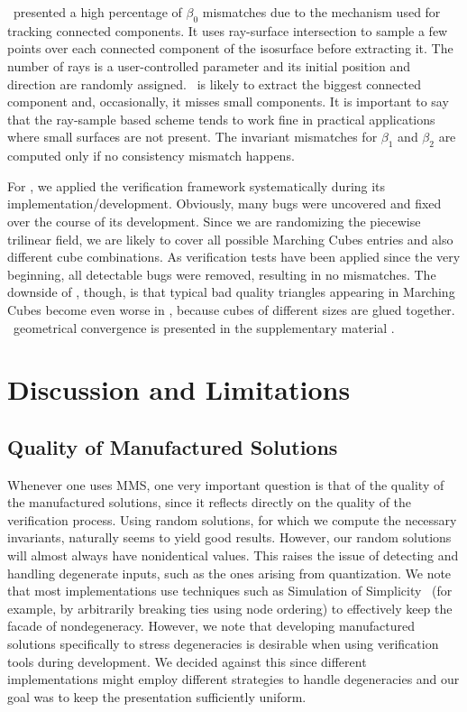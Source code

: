 \deliso\ presented a high percentage of $\beta_0$ mismatches due to the
mechanism used for tracking connected components. It uses ray-surface intersection to
sample a few points over each connected component of the isosurface before extracting it.
The number of rays is a user-controlled parameter and its initial position
and direction are randomly assigned. \deliso\ is likely to extract the biggest
connected component and, occasionally, it misses small components. It is
important to say that
the ray-sample based scheme tends to work fine in practical applications where
small
surfaces are not present. The invariant mismatches for $\beta_1$ and $\beta_2$
are computed only
if no consistency mismatch happens.

For \mcsimpleflow, we applied the verification
framework systematically during its implementation/development. Obviously, many
bugs were uncovered and fixed over the course of its development. 
Since we are randomizing the piecewise trilinear field, we are
likely to cover all possible Marching Cubes entries and also different
cube combinations. As verification tests have been applied since the very beginning,
all detectable bugs were removed, resulting in no mismatches. 
The downside of \mcsimpleflow, though, is that typical bad quality
triangles appearing in Marching Cubes become even worse in
\mcsimpleflow,
because cubes of different sizes are glued together. 
\mcsimpleflow\ geometrical
convergence is presented in the supplementary material
\cite{scheidegger:techreport:2010}.


\section{Discussion and Limitations}
\label{sec:discussion}

\subsection{Quality of Manufactured Solutions}
Whenever one uses MMS, one very important question is that of the quality
of the manufactured solutions, since it reflects directly on the
quality of the verification process. Using random solutions, for which
we compute the necessary invariants, naturally seems to yield good
results. However, our random solutions will almost always have
nonidentical values. This raises the issue of detecting and handling
degenerate inputs, such as the ones arising from quantization. We
note that most implementations use techniques such as Simulation of
Simplicity~\cite{Edelsbrunner:1990:SOS} (for example, by arbitrarily breaking ties using node
ordering) to effectively keep the facade of nondegeneracy. However, we note
that developing manufactured solutions
specifically to stress degeneracies is desirable when using
verification tools during development. We decided against this since
different implementations might employ different strategies to handle
degeneracies and our goal was to keep the presentation sufficiently
uniform.

